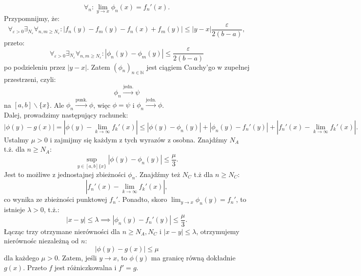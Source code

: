 \documentclass{article}
\numberwithin{defi}{section}
\numberwithin{defi}{section}
\newcommand{\N}{\mathbb{N}}
\newcommand{\oo}{\infty}
\providecommand{\eps}{\varepsilon}
\renewcommand{\geq}{\geqslant}
\renewcommand{\leq}{\leqslant}
\newcommand{\ciag}[1]{(#1_{n})_{n \in \N}}
\newcommand{\topunk}{\xrightarrow{\text{punk.}}}
\newcommand{\tojedn}{\xrightarrow{\text{jedn.}}}
\begin{document}
\begin{dow}
\begin{equation*}
        \forall_n: \lim_{y \to x} \phi_n(x) = f_n'(x).
    \end{equation*} Przypomnijmy, że: \begin{equation*}
        \forall_{\eps > 0} \exists_{N_\eps} \forall_{n, m \geq N_\eps}: | f_n(y) - f_m(y) - f_n(x) + f_m(y)| \leq | y - x| \frac{\eps}{2(b-a)},
    \end{equation*} przeto: \begin{equation*}
        \forall_{\eps > 0} \exists_{N_\eps} \forall_{n, m \geq N_\eps}:  | \phi_n(y) - \phi_m(y) | \leq \frac{\eps}{2(b-a)}
    \end{equation*} po podzieleniu przez $|y - x|$. Zatem $\ciag{\phi}$ jest ciągiem Cauchy'go w zupełnej przestrzeni, czyli: \begin{equation*}
        \phi_n \tojedn \psi
    \end{equation*} na $[a, b] \backslash \{x\}$. Ale $\phi_n \topunk \phi$, więc $\phi = \psi$ i $\phi_n \tojedn \phi$. \\
    Dalej, prowadzimy następujący rachunek: \begin{equation*}
        | \phi(y) - g(x) | = | \phi(y) - \lim_{k \to \oo} f_k'(x)| \leq |\phi(y) - \phi_n(y)| + | \phi_n(y) - f_n'(y) | + |f_n'(x) - \lim_{k \to \oo} f_k'(x)|.
    \end{equation*} Ustalmy $\mu >0 $ i zajmijmy się każdym z tych wyrazów z osobna. Znajdźmy $N_A$ t.ż. dla $n \geq N_A$: \begin{equation*}
        \sup_{y \in [a, b] \{x\}} | \phi(y) - \phi_n(y)| \leq \frac{\mu}{3}.
    \end{equation*} Jest to możliwe z jednostajnej zbieżności $\phi_n$. Znajdźmy też $N_C$ t.ż dla $n \geq N_C$: \begin{equation*}
        |f_n'(x) - \lim_{k \to \oo} f_k'(x)|,
    \end{equation*} co wynika ze zbieżności punktowej $f_n'$. Ponadto, skoro $\lim_{y \to x} \phi_n(y) = f_n'$, to istnieje $\lambda > 0$, t.ż.: \begin{equation*}
        | x - y| \leq \lambda \implies | \phi_n(y) - f_n'(y) | \leq \frac{\mu}{3}.
    \end{equation*} Łącząc trzy otrzymane nierówności dla $n \geq N_A, N_C$ i $|x - y| \leq \lambda$, otrzymujemy nierównośc niezależną od $n$: \begin{equation*}
        | \phi(y) - g(x) | \leq \mu
    \end{equation*} dla każdego $\mu > 0$. Zatem, jeśli $y \to x$, to $\phi(y)$ ma granicę równą dokładnie $g(x)$. Przeto $f$ jest różniczkowalna i $f' = g$.
\end{dow} 
\end{document}
